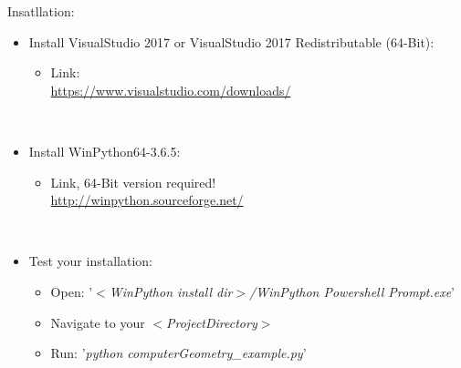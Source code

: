 \documentclass[]{article}
\begin{document}
Insatllation:
\begin{itemize}
	\item Install VisualStudio 2017 or VisualStudio 2017 Redistributable (64-Bit):
	\begin{itemize}
		\item Link:\\ \url{https://www.visualstudio.com/downloads/}
	\end{itemize}
	
	\mbox{}\\
	\item Install WinPython64-3.6.5:
	\begin{itemize}
		\item Link, 64-Bit version required!\\ \url{http://winpython.sourceforge.net/} 
	\end{itemize}

	\mbox{}\\
	\item Test your installation:
	\begin{itemize}
		\item Open: '\textit{$<$WinPython install dir$>$/WinPython Powershell Prompt.exe}'
		\item Navigate to your \textit{$<$ProjectDirectory$>$}
		\item Run: '\textit{python computerGeometry\_example.py}'
	\end{itemize}
	
\end{itemize}
\end{document}
